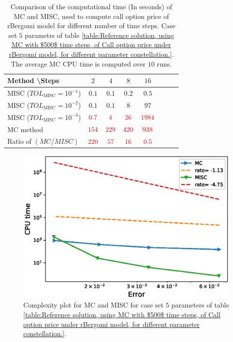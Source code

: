 \FloatBarrier
\begin{table}[h!]
	\centering
	\begin{tabular}{l*{6}{c}r}
		Method \textbackslash  Steps            & $2$ & $4$ & $8$ & $16$ &   \\
		\hline
		MISC ($TOL_{\text{MISC}}=10^{-1}$)  & $0.1$ & $0.1$ & $0.2$ & $0.5$ \\
		MISC ($TOL_{\text{MISC}}=10^{-2}$)  & $0.1$ & $0.1$ & $8$ & $97$ \\
		MISC ($TOL_{\text{MISC}}=10^{-3}$)  & $\red{0.7}$ & $\red{4}$ & $\red{26}$ & $\red{1984}$ \\
		\hline
		MC method   & $ \red{154}
		
		$  & $  \red{229}$  & $  \red{420}$ & $ \red{938}
		$  \\	
		\hline
		Ratio of $\left(MC/MISC \right)$ & $ \red{   220}
		
		$  & $  \red{
		 57
		}$  & $  \red{    16
		}$ & $ \red{ 0.5}
		$  \\	
				
		\hline
	\end{tabular}
	\caption{Comparison of the computational time (In seconds) of  MC and MISC, used to compute call option price of rBergomi model for different number of time steps. Case set $5$ parametrs of table \ref{table:Reference solution, using MC with $500$ time steps, of Call option price under rBergomi model, for different parameter constellation.}. The average  MC CPU time is computed over $10$ runs. }
	\label{Comparsion of the computational time of  MC and MISC, used to compute Call option price of rBergomi model for different number of time steps. Case set5}
\end{table}

\FloatBarrier


	\begin{figure}[h!]
	\centering
	\includegraphics[width=0.4\linewidth]{./figures/rBergomi_Complexity_rates/set7/error_vs_time_set7}
	
	\caption{Complexity plot for   MC and MISC for case set $5$ parameters of table \ref{table:Reference solution, using MC with $500$ time steps, of Call option price under rBergomi model, for different parameter constellation.}.}
	\label{fig:Complexity plot for MC and MISC for Case set $5$ parameters}
\end{figure}
\FloatBarrier



